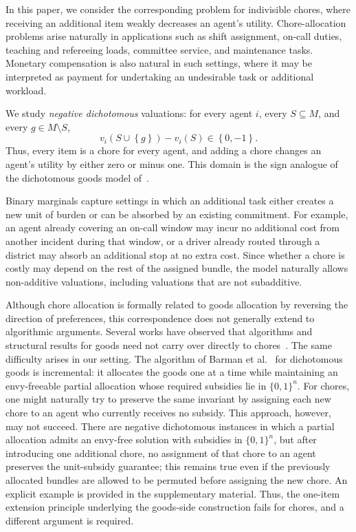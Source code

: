 \documentclass[sigconf,anonymous]{aamas}
\newcommand{\items}{M}
\newcommand{\set}[1]{\left\{#1\right\}}
\theoremstyle{acmplain}
\theoremstyle{acmdefinition}
\theoremstyle{acmplain}
\begin{document}
In this paper, we consider the corresponding problem for indivisible chores, where receiving an additional item weakly decreases an agent's utility. Chore-allocation problems arise naturally in applications such as shift assignment, on-call duties, teaching and refereeing loads, committee service, and maintenance tasks. Monetary compensation is also natural in such settings, where it may be interpreted as payment for undertaking an undesirable task or additional workload.

We study \emph{negative dichotomous} valuations: for every agent $i$, every $S\subseteq \items$, and every $g\in \items\setminus S$, \[ v_i(S\cup\set{g})-v_i(S)\in\set{0,-1}. \] Thus, every item is a chore for every agent, and adding a chore changes an agent's utility by either zero or minus one. This domain is the sign analogue of the dichotomous goods model of~\cite{BKNS22}.

Binary marginals capture settings in which an additional task either creates a new unit of burden or can be absorbed by an existing commitment. For example, an agent already covering an on-call window may incur no additional cost from another incident during that window, or a driver already routed through a district may absorb an additional stop at no extra cost. Since whether a chore is costly may depend on the rest of the assigned bundle, the model naturally allows non-additive valuations, including valuations that are not subadditive.

Although chore allocation is formally related to goods allocation by reversing the direction of preferences, this correspondence does not generally extend to algorithmic arguments. Several works have observed that algorithms and structural results for goods need not carry over directly to chores~\cite{aziz2017algorithms,sun2023fairness, BSV21}. The same difficulty arises in our setting. The algorithm of Barman et al.~\cite{BKNS22} for dichotomous goods is incremental: it allocates the goods one at a time while maintaining an envy-freeable partial allocation whose required subsidies lie in $\{0,1\}^n$. For chores, one might naturally try to preserve the same invariant by assigning each new chore to an agent who currently receives no subsidy. This approach, however, may not succeed. There are negative dichotomous instances in which a partial allocation admits an envy-free solution with subsidies in $\{0,1\}^n$, but after introducing one additional chore, no assignment of that chore to an agent preserves the unit-subsidy guarantee; this remains true even if the previously allocated bundles are allowed to be permuted before assigning the new chore. An explicit example is provided in the supplementary material. Thus, the one-item extension principle underlying the goods-side construction fails for chores, and a different argument is required.
\end{document}
